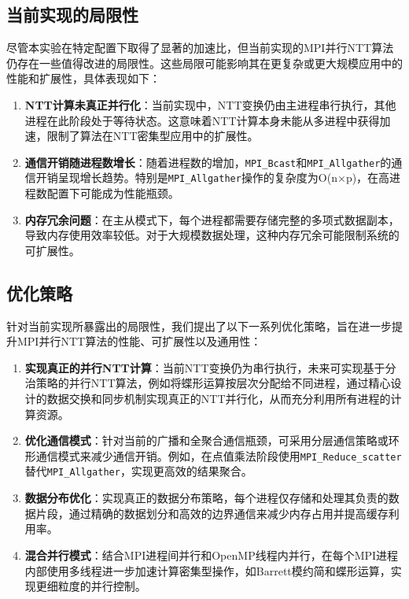 \documentclass[a4paper]{article}
\begin{document}
\subsection{当前实现的局限性}

尽管本实验在特定配置下取得了显著的加速比，但当前实现的MPI并行NTT算法仍存在一些值得改进的局限性。这些局限可能影响其在更复杂或更大规模应用中的性能和扩展性，具体表现如下：

\begin{enumerate}
  \item \textbf{NTT计算未真正并行化}：当前实现中，NTT变换仍由主进程串行执行，其他进程在此阶段处于等待状态。这意味着NTT计算本身未能从多进程中获得加速，限制了算法在NTT密集型应用中的扩展性。
  \item \textbf{通信开销随进程数增长}：随着进程数的增加，\texttt{MPI\_Bcast}和\texttt{MPI\_Allgather}的通信开销呈现增长趋势。特别是\texttt{MPI\_Allgather}操作的复杂度为O(n×p)，在高进程数配置下可能成为性能瓶颈。
  \item \textbf{内存冗余问题}：在主从模式下，每个进程都需要存储完整的多项式数据副本，导致内存使用效率较低。对于大规模数据处理，这种内存冗余可能限制系统的可扩展性。
\end{enumerate}

\subsection{优化策略}

针对当前实现所暴露出的局限性，我们提出了以下一系列优化策略，旨在进一步提升MPI并行NTT算法的性能、可扩展性以及通用性：

\begin{enumerate}
  \item \textbf{实现真正的并行NTT计算}：当前NTT变换仍为串行执行，未来可实现基于分治策略的并行NTT算法，例如将蝶形运算按层次分配给不同进程，通过精心设计的数据交换和同步机制实现真正的NTT并行化，从而充分利用所有进程的计算资源。
  \item \textbf{优化通信模式}：针对当前的广播和全聚合通信瓶颈，可采用分层通信策略或环形通信模式来减少通信开销。例如，在点值乘法阶段使用\texttt{MPI\_Reduce\_scatter}替代\texttt{MPI\_Allgather}，实现更高效的结果聚合。
  \item \textbf{数据分布优化}：实现真正的数据分布策略，每个进程仅存储和处理其负责的数据片段，通过精确的数据划分和高效的边界通信来减少内存占用并提高缓存利用率。
  \item \textbf{混合并行模式}：结合MPI进程间并行和OpenMP线程内并行，在每个MPI进程内部使用多线程进一步加速计算密集型操作，如Barrett模约简和蝶形运算，实现更细粒度的并行控制。
\end{enumerate}
\end{document}
